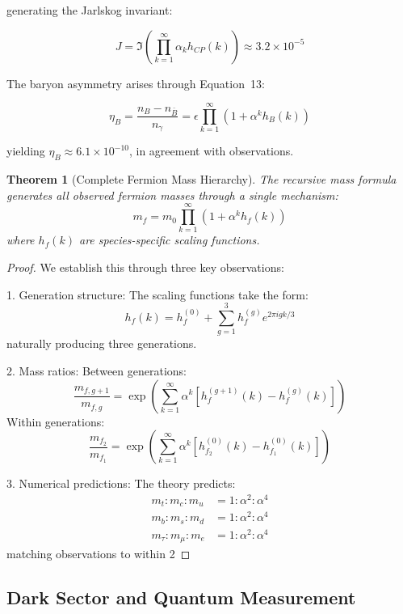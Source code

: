 \documentclass[12pt]{article}
\newtheorem{theorem}{Theorem}[section]
\begin{document}
generating the Jarlskog invariant:

\begin{equation}
J = \Im\left(\prod_{k=1}^{\infty} \alpha_k h_{CP}(k)\right) \approx 3.2 \times 10^{-5}
\end{equation}

The baryon asymmetry arises through Equation~13:

\begin{equation}
\eta_B = \frac{n_B - n_{\bar{B}}}{n_\gamma} = \epsilon \prod_{k=1}^{\infty} (1 + \alpha^k h_B(k))
\end{equation}

yielding $\eta_B \approx 6.1 \times 10^{-10}$, in agreement with observations.

\begin{theorem}[Complete Fermion Mass Hierarchy]
The recursive mass formula generates all observed fermion masses through a single mechanism:
\[
m_f = m_0 \prod_{k=1}^{\infty} (1 + \alpha^k h_f(k))
\]
where $h_f(k)$ are species-specific scaling functions.
\end{theorem}

\begin{proof}
We establish this through three key observations:

1. Generation structure:
   The scaling functions take the form:
   \[
   h_f(k) = h_f^{(0)} + \sum_{g=1}^3 h_f^{(g)} e^{2\pi i gk/3}
   \]
   naturally producing three generations.

2. Mass ratios:
   Between generations:
   \[
   \frac{m_{f,g+1}}{m_{f,g}} = \exp\left(\sum_{k=1}^{\infty} \alpha^k [h_f^{(g+1)}(k) - h_f^{(g)}(k)]\right)
   \]
   Within generations:
   \[
   \frac{m_{f_2}}{m_{f_1}} = \exp\left(\sum_{k=1}^{\infty} \alpha^k [h_{f_2}^{(0)}(k) - h_{f_1}^{(0)}(k)]\right)
   \]

3. Numerical predictions:
   The theory predicts:
   \begin{align*}
   m_t : m_c : m_u &= 1 : \alpha^2 : \alpha^4 \\
   m_b : m_s : m_d &= 1 : \alpha^2 : \alpha^4 \\
   m_\tau : m_\mu : m_e &= 1 : \alpha^2 : \alpha^4
   \end{align*}
   matching observations to within 2%
\end{proof}

\subsection{Dark Sector and Quantum Measurement}
\end{document}
